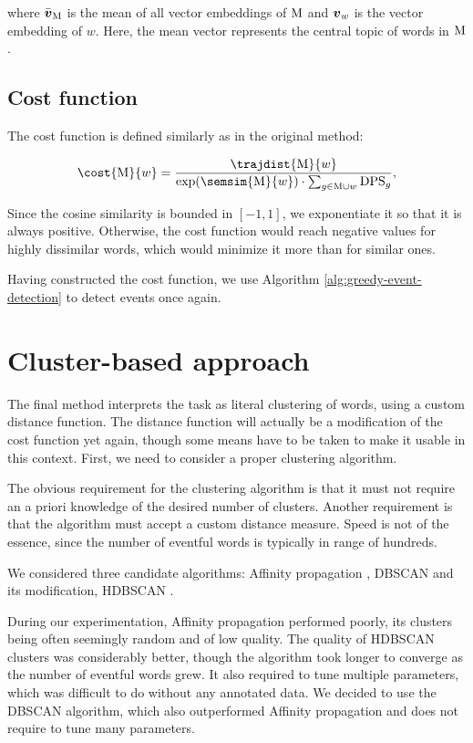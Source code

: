 where $\bar{\embed}_{\featset}$ is the mean of all vector embeddings of $\text{M}$ and $\embed_{w}$ is the vector embedding of $w$. Here, the mean vector represents the central topic of words in $\text{M}$.


\subsection{Cost function}
The cost function is defined similarly as in the original method:

\begin{equation} \label{eq:cost-function}
	\cost{\featset}{w} = \frac{\trajdist{\featset}{w}}{\exp(\semsim{\featset}{w}) \cdot \sum_{g \in \featset \cup w}{\text{DPS}_{g}}},
\end{equation}

Since the cosine similarity is bounded in $[-1, 1]$, we exponentiate it so that it is always positive. Otherwise, the cost function would reach negative values for highly dissimilar words, which would minimize it more than for similar ones.

Having constructed the cost function, we use Algorithm \ref{alg:greedy-event-detection} to detect events once again.


\section{Cluster-based approach}
The final method interprets the task as literal clustering of words, using a custom distance function. The distance function will actually be a modification of the cost function yet again, though some means have to be taken to make it usable in this context. First, we need to consider a proper clustering algorithm.

The obvious requirement for the clustering algorithm is that it must not require an a priori knowledge of the desired number of clusters. Another requirement is that the algorithm must accept a custom distance measure. Speed is not of the essence, since the number of eventful words is typically in range of hundreds.

We considered three candidate algorithms: Affinity propagation \citep{affinity-propagation}, DBSCAN \citep{dbscan} and its modification, HDBSCAN \citep{hdbscan}.

During our experimentation, Affinity propagation performed poorly, its clusters being often seemingly random and of low quality. The quality of HDBSCAN clusters was considerably better, though the algorithm took longer to converge as the number of eventful words grew. It also required to tune multiple parameters, which was difficult to do without any annotated data. We decided to use the DBSCAN algorithm, which also outperformed Affinity propagation and does not require to tune many parameters.

